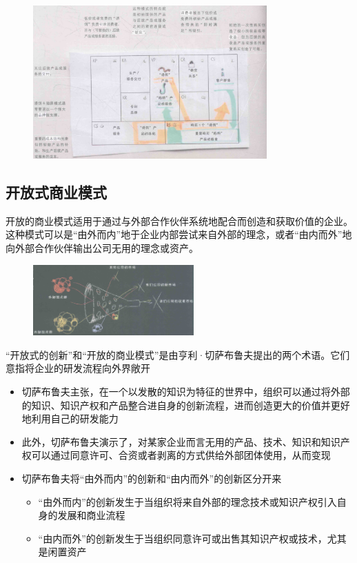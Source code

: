     \begin{figure}[H]
		\centering
        \vspace{-0.5em}
		\includegraphics[width=0.8\textwidth]{img/诱饵&陷阱模式.png}
        \vspace{-0.5em}
	\end{figure}

    \subsection{开放式商业模式}
    开放的商业模式适用于通过与外部合作伙伴系统地配合而创造和获取价值的企业。这种模式可以是“由外而内”地于企业内部尝试来自外部的理念，或者“由内而外”地向外部合作伙伴输出公司无用的理念或资产。

    \begin{figure}[H]
		\centering
        \vspace{-0.5em}
		\includegraphics[width=0.55\textwidth]{img/开放的商业模式.png}
        \vspace{-0.5em}
	\end{figure}

    “开放式的创新”和“开放的商业模式”是由亨利·切萨布鲁夫提出的两个术语。它们意指将企业的研发流程向外界敞开
    \begin{itemize}
        \item 切萨布鲁夫主张，在一个以发散的知识为特征的世界中，组织可以通过将外部的知识、知识产权和产品整合进自身的创新流程，进而创造更大的价值并更好地利用自己的研发能力
        \item 此外，切萨布鲁夫演示了，对某家企业而言无用的产品、技术、知识和知识产权可以通过同意许可、合资或者剥离的方式供给外部团体使用，从而变现
        \item 切萨布鲁夫将“由外而内”的创新和“由内而外”的创新区分开来
        \begin{itemize}
            \item “由外而内”的创新发生于当组织将来自外部的理念技术或知识产权引入自身的发展和商业流程
            \item “由内而外”的创新发生于当组织同意许可或出售其知识产权或技术，尤其是闲置资产
        \end{itemize}
    \end{itemize}

